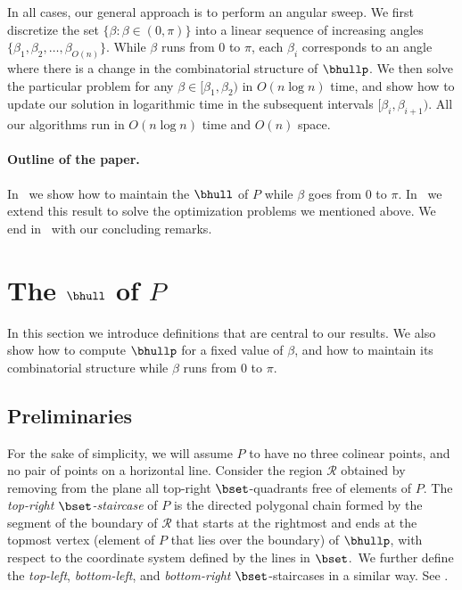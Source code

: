 \documentclass[11pt,letterpaper,english]{article}
\theoremstyle{definition}
\begin{document}
In all cases, our general approach is to perform an angular sweep. We
first discretize the set $\{\beta:\beta \in (0,\pi)\}$ into a linear
sequence of increasing angles
$\{\beta_{1},\beta_{2},\ldots,\beta_{O(n)}\}$. While $\beta$ runs from
$0$ to $\pi$, each $\beta_i$ corresponds to an angle where there is a
change in the combinatorial structure of $\bhullp$. We then solve the
particular problem for any $\beta \in [\beta_{1}, \beta_{2})$ in
$O(n\log n)$ time, and show how to update our solution in logarithmic time in the
subsequent intervals $[\beta_{i},\beta_{i+1})$. All our algorithms run
in $O(n\log n)$ time and $O(n)$ space.

\paragraph{Outline of the paper.}

In~ we show how to maintain the $\bhull$ of $P$ while
$\beta$ goes from $0$ to $\pi$. In~ we extend
this result to solve the optimization problems we mentioned above. We
end in~ with our concluding remarks.

\section{The $\bhull$ of $P$}\label{sec:bhull}

In this section we introduce definitions that are central to our
results. We also show how to compute $\bhullp$ for a fixed value of
$\beta$, and how to maintain its combinatorial structure while $\beta$ runs
from $0$ to $\pi$.

\subsection{Preliminaries}\label{sec:bhull:preliminaries}

For the sake of simplicity, we
will assume $P$ to have no three colinear points, and no pair of
points on a horizontal line.
Consider the region $\mathcal{R}$ obtained by removing from the plane
all top-right $\bset$-quadrants free of elements of $P$. The
\emph{top-right $\bset$-staircase} of $P$ is the directed polygonal
chain formed by the segment of the boundary of $\mathcal{R}$ that
starts at the rightmost and ends at the topmost vertex (element of $P$
that lies over the boundary) of $\bhullp$, with respect to the
coordinate system defined by the lines in $\bset$.~We further define
the \emph{top-left}, \emph{bottom-left}, and \emph{bottom-right}
$\bset$-staircases in a similar way. See .
\end{document}
